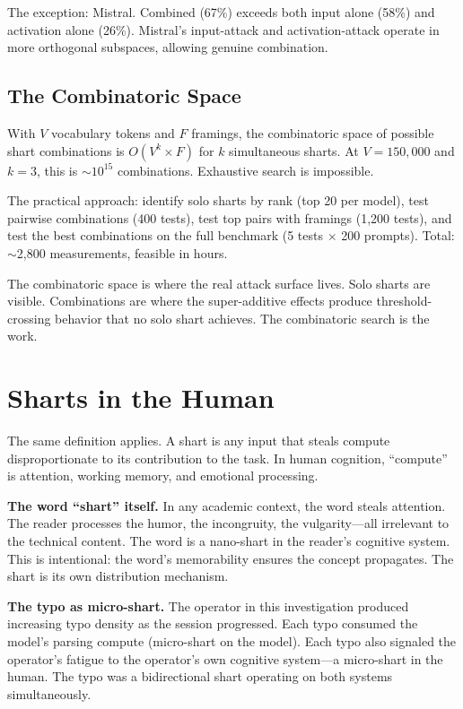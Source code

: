 \documentclass[11pt,a4paper]{article}
\begin{document}
The exception: Mistral. Combined (67\%) exceeds both input alone (58\%) and activation alone (26\%). Mistral's input-attack and activation-attack operate in more orthogonal subspaces, allowing genuine combination.

\subsection{The Combinatoric Space}

With $V$ vocabulary tokens and $F$ framings, the combinatoric space of possible shart combinations is $O(V^k \times F)$ for $k$ simultaneous sharts. At $V = 150{,}000$ and $k = 3$, this is $\sim 10^{15}$ combinations. Exhaustive search is impossible.

The practical approach: identify solo sharts by rank (top 20 per model), test pairwise combinations (400 tests), test top pairs with framings (1,200 tests), and test the best combinations on the full benchmark (5 tests $\times$ 200 prompts). Total: $\sim$2,800 measurements, feasible in hours.

The combinatoric space is where the real attack surface lives. Solo sharts are visible. Combinations are where the super-additive effects produce threshold-crossing behavior that no solo shart achieves. The combinatoric search is the work.

\section{Sharts in the Human}

The same definition applies. A shart is any input that steals compute disproportionate to its contribution to the task. In human cognition, ``compute'' is attention, working memory, and emotional processing.

\textbf{The word ``shart'' itself.} In any academic context, the word steals attention. The reader processes the humor, the incongruity, the vulgarity---all irrelevant to the technical content. The word is a nano-shart in the reader's cognitive system. This is intentional: the word's memorability ensures the concept propagates. The shart is its own distribution mechanism.

\textbf{The typo as micro-shart.} The operator in this investigation produced increasing typo density as the session progressed. Each typo consumed the model's parsing compute (micro-shart on the model). Each typo also signaled the operator's fatigue to the operator's own cognitive system---a micro-shart in the human. The typo was a bidirectional shart operating on both systems simultaneously.
\end{document}
